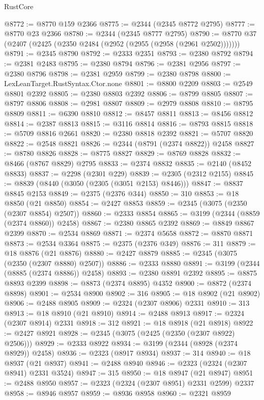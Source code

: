 \begin{lexlean}{RustCore}
\begin{coremodule}
@8772 := @8770 @159 @2366
@8775 := @2344 (@2345 @8772 @2795)
@8777 := @8770 @23 @2366
@8780 := @2344 (@2345 @8777 @2795)
@8790 := @8770 @37 (@2407 (@2425 (@2350 @2484 (@2952 (@2955 (@2958 (@2961 @2502)))))))
@8791 := @2345 @8790
@8792 := @2333 @2351
@8793 := @2380 @8792
@8794 := @2381 @2483
@8795 := @2380 @8794
@8796 := @2381 @2956
@8797 := @2380 @8796
@8798 := @2381 @2959
@8799 := @2380 @8798
@8800 := LexLeanTarget.RustSyntax.Ctor.none
@8801 := @8800 @2209
@8803 := @2549 @8801 @2392
@8805 := @2380 @8803 @2392
@8806 := @8799 @8805
@8807 := @8797 @8806
@8808 := @2981 @8807
@8809 := @2979 @8808
@8810 := @8795 @8809
@8811 := @6390 @8810
@8812 := @8457 @8811
@8813 := @8456 @8812
@8814 := @2387 @8813
@8815 := @3116 @8814
@8816 := @8793 @8815
@8818 := @5709 @8816 @2661
@8820 := @2380 @8818 @2392
@8821 := @5707 @8820
@8822 := @2548 @8821
@8826 := @2344 (@8791 (@2374 @8822)) @2458
@8827 := @8780 @8826
@8828 := @8775 @8827
@8829 := @8769 @8828
@8832 := @8466 (@8767 @8829) @2795
@8833 := @2374 @8832
@8835 := @2140 (@8452 @8833)
@8837 := @2298 (@2301 @229)
@8839 := @2305 (@2312 @2155)
@8845 := @8839 (@8440 (@3050 (@2305 (@3051 @2153) @8446)))
@8847 := @8837 @8845 @2153
@8849 := @2375 (@2376 @344)
@8850 := 310
@8853 := @18 @8850 (@21 @8850)
@8854 := @2427 @8853
@8859 := @2345 (@3075 (@2350 (@2307 @8854) @2507))
@8860 := @2333 @8854
@8865 := @3199 (@2344 (@8859 (@2374 @8860)) @2458)
@8867 := @2380 @8865 @2392
@8869 := @8849 @8867 @2399
@8870 := @2534 @8869
@8871 := @2374 @5658
@8872 := @8870 @8871
@8873 := @2534 @3364
@8875 := @2375 (@2376 @349)
@8876 := 311
@8879 := @18 @8876 (@21 @8876)
@8880 := @2427 @8879
@8885 := @2345 (@3075 (@2350 (@2307 @8880) @2507))
@8886 := @2333 @8880
@8891 := @3199 (@2344 (@8885 (@2374 @8886)) @2458)
@8893 := @2380 @8891 @2392
@8895 := @8875 @8893 @2399
@8898 := @8873 (@2374 @8895) @4352
@8900 := @8872 (@2374 @8898)
@8901 := @2534 @8900
@8902 := 316
@8905 := @18 @8902 (@21 @8902)
@8906 := @2488 @8905
@8909 := @2324 (@2307 @8906) @2331
@8910 := 313
@8913 := @18 @8910 (@21 @8910)
@8914 := @2488 @8913
@8917 := @2324 (@2307 @8914) @2331
@8918 := 312
@8921 := @18 @8918 (@21 @8918)
@8922 := @2427 @8921
@8928 := @2345 (@3075 (@2425 (@2350 (@2307 @8922) @2506)))
@8929 := @2333 @8922
@8934 := @3199 (@2344 (@8928 (@2374 @8929)) @2458)
@8936 := @2323 (@8917 @8934)
@8937 := 314
@8940 := @18 @8937 (@21 @8937)
@8941 := @2488 @8940
@8946 := @2323 (@2324 (@2307 @8941) @2331 @3524)
@8947 := 315
@8950 := @18 @8947 (@21 @8947)
@8951 := @2488 @8950
@8957 := @2323 (@2324 (@2307 @8951) @2331 @2599) @2337
@8958 := @8946 @8957
@8959 := @8936 @8958
@8960 := @2321 @8959

\end{coremodule}
\end{lexlean}
